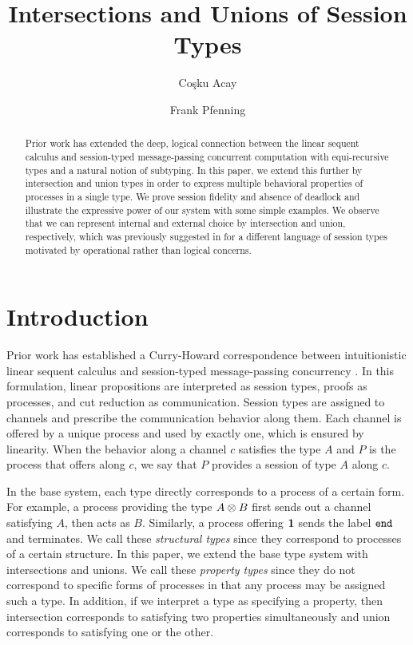 \documentclass[submission,copyright,creativecommons]{eptcs}
\title{Intersections and Unions of Session Types}
\author{Co\c{s}ku Acay
\institute{Carnegie Mellon University\\
Pennsylvania, USA}
\email{cacay@cmu.edu}
\and
Frank Pfenning
\institute{Carnegie Mellon University \\
Pennsylvania, USA}
\email{fp@cs.cmu.edu}
}
\begin{document}
\maketitle

\begin{abstract}
  Prior work has extended the deep, logical connection between the linear sequent calculus and session-typed message-passing concurrent computation with equi-recursive types and a natural notion of subtyping. In this paper, we extend this further by intersection and union types in order to express multiple behavioral properties of processes in a single type. We prove session fidelity and absence of deadlock and illustrate the expressive power of our system with some simple examples. We observe that we can represent internal and external choice by intersection and union, respectively, which was previously suggested in \cite{CastagnaDGP09,Padovani10} for a different language of session types motivated by operational rather than logical concerns.
\end{abstract}


\section{Introduction}

Prior work has established a Curry-Howard correspondence between intuitionistic linear sequent calculus and session-typed message-passing concurrency \cite{CairesP10, PfenningG15, Honda93}. In this formulation, linear propositions are interpreted as session types, proofs as processes, and cut reduction as communication. Session types are assigned to channels and prescribe the communication behavior along them. Each channel is offered by a unique process and used by exactly one, which is ensured by linearity. When the behavior along a channel $c$ satisfies the type $A$ and $P$ is the process that offers along $c$, we say that $P$ provides a session of type $A$ along $c$.

In the base system, each type directly corresponds to a process of a certain form. For example, a process providing the type $A \otimes B$ first sends out a channel satisfying $A$, then acts as $B$. Similarly, a process offering $\mathbf{1}$ sends the label $\texttt{end}$ and terminates. We call these \emph{structural types} since they correspond to processes of a certain structure. In this paper, we extend the base type system with intersections and unions. We call these \emph{property types} since they do not correspond to specific forms of processes in that any process may be assigned such a type. In addition, if we interpret a type as specifying a property, then intersection corresponds to satisfying two properties simultaneously and union corresponds to satisfying one or the other.
\end{document}
